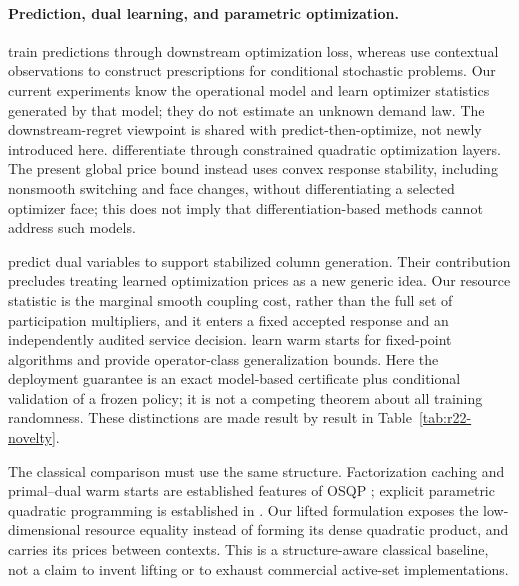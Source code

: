 \paragraph{Prediction, dual learning, and parametric optimization.}
\citet{ElmachtoubGrigas2022} train predictions through downstream optimization loss, whereas \citet{BertsimasKallus2020} use contextual observations to construct prescriptions for conditional stochastic problems. Our current experiments know the operational model and learn optimizer statistics generated by that model; they do not estimate an unknown demand law. The downstream-regret viewpoint is shared with predict-then-optimize, not newly introduced here. \citet{AmosKolter2017} differentiate through constrained quadratic optimization layers. The present global price bound instead uses convex response stability, including nonsmooth switching and face changes, without differentiating a selected optimizer face; this does not imply that differentiation-based methods cannot address such models.

\citet{KraulSeizingerBrunner2023} predict dual variables to support stabilized column generation. Their contribution precludes treating learned optimization prices as a new generic idea. Our resource statistic is the marginal smooth coupling cost, rather than the full set of participation multipliers, and it enters a fixed accepted response and an independently audited service decision. \citet{Sambharya2024} learn warm starts for fixed-point algorithms and provide operator-class generalization bounds. Here the deployment guarantee is an exact model-based certificate plus conditional validation of a frozen policy; it is not a competing theorem about all training randomness. These distinctions are made result by result in Table~\ref{tab:r22-novelty}.

The classical comparison must use the same structure. Factorization caching and primal--dual warm starts are established features of OSQP \citep{Stellato2020}; explicit parametric quadratic programming is established in \citet{Bemporad2002}. Our lifted formulation exposes the low-dimensional resource equality instead of forming its dense quadratic product, and carries its prices between contexts. This is a structure-aware classical baseline, not a claim to invent lifting or to exhaust commercial active-set implementations.


